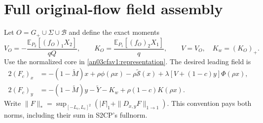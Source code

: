 \documentclass[11pt]{article}
\theoremstyle{remark}\newtheorem{remark}[theorem]{Remark}
\newcommand{\E}{\mathbb E}
\newcommand{\BB}{\mathcal B}
\newcommand{\Gp}{G_+}
\begin{document}
\section{Full original-flow field assembly}
Let $O=\Gp\cup\Sigma\cup\BB$ and define the exact moments
\begin{equation}
 V_O=-\frac{\E_{P_2}[(f_O)_1X_2]}{qQ},\qquad
 K_O=\frac{\E_{P_1}[(f_O)_2X_1]}q,\qquad
 V=V_O,\quad K_w=(K_O)_+.
 \label{an03cfav1:VK}
\end{equation}
Use the normalized core in \eqref{an03cfav1:representation}.
The desired leading field is
\begin{align}
 2(F_c)_x&=-(1-\widetilde M)x+\rho\phi(\rho x)
       -\rho\widetilde{\mathcal S}(x)
       +\lambda[V+(1-c)y]\Phi(\rho x),\nonumber\\
 2(F_c)_y&=-(1-\widetilde M)y-\widetilde Y-K_w
                         +\rho(1-c)K(\rho x).
 \label{an03cfav1:cform}
\end{align}
Write $\|F\|_*=\sup_{[-L_c,L_c]^2}
(|F|_1+\|D_{x,y}F\|_{1\to1})$. This convention pays both
norms, including their sum in S2CP's fullnorm.
\end{document}
